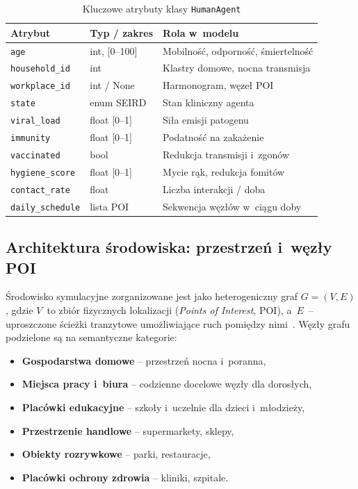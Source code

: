 \documentclass[polish]{projectreport}
\begin{document}
\begin{table}[!htbp]
\centering
\caption{Kluczowe atrybuty klasy \texttt{HumanAgent}}
\begin{tabularx}{\columnwidth}{@{}lYY@{}} \toprule
  \textbf{Atrybut} & \textbf{Typ / zakres} & \textbf{Rola w~modelu} \\ \midrule
  \texttt{age} & int, [0--100] & Mobilność, odporność, śmiertelność \\
  \texttt{household\_id} & int & Klastry domowe, nocna transmisja \\
  \texttt{workplace\_id} & int / None & Harmonogram, węzeł POI \\
  \texttt{state} & enum SEIRD & Stan kliniczny agenta \\
  \texttt{viral\_load} & float [0--1] & Siła emisji patogenu \\
  \texttt{immunity} & float [0--1] & Podatność na zakażenie \\
  \texttt{vaccinated} & bool & Redukcja transmisji i~zgonów \\
  \texttt{hygiene\_score} & float [0--1] & Mycie rąk, redukcja fomitów \\
  \texttt{contact\_rate} & float & Liczba interakcji / doba \\
  \texttt{daily\_schedule} & lista POI & Sekwencja węzłów w~ciągu doby \\
  \bottomrule
\end{tabularx}
\label{tab:agent-attrs}
\end{table}

\subsection{Architektura środowiska: przestrzeń i~węzły POI}
\label{sec:environment}

Środowisko symulacyjne zorganizowane jest jako heterogeniczny graf
$G = (V, E)$, gdzie $V$~to zbiór fizycznych lokalizacji
(\textit{Points of Interest}, POI), a~$E$~-- uproszczone ścieżki tranzytowe
umożliwiające ruch pomiędzy nimi~\cite{eubank2004modelling}. Węzły grafu
podzielone są na semantyczne kategorie:

\begin{itemize}
  \item \textbf{Gospodarstwa domowe} -- przestrzeń nocna i~poranna,
  \item \textbf{Miejsca pracy i~biura} -- codzienne docelowe węzły dla dorosłych,
  \item \textbf{Placówki edukacyjne} -- szkoły i~uczelnie dla dzieci i~młodzieży,
  \item \textbf{Przestrzenie handlowe} -- supermarkety, sklepy,
  \item \textbf{Obiekty rozrywkowe} -- parki, restauracje,
  \item \textbf{Placówki ochrony zdrowia} -- kliniki, szpitale.
\end{itemize}
\end{document}
